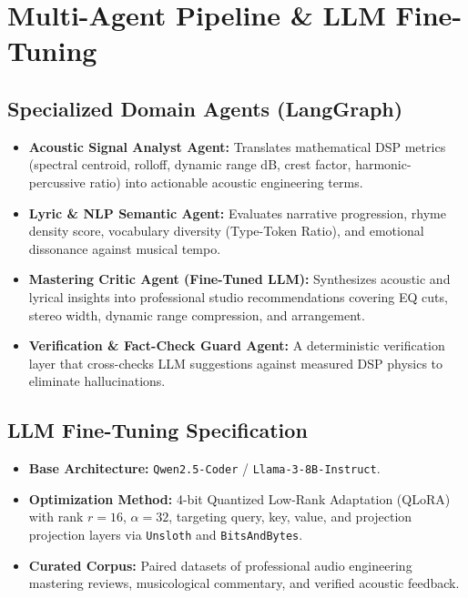 \documentclass[11pt,a4paper]{article}
\begin{document}
\section{Multi-Agent Pipeline \& LLM Fine-Tuning}

\subsection{Specialized Domain Agents (LangGraph)}
\begin{itemize}
    \item \textbf{Acoustic Signal Analyst Agent:} Translates mathematical DSP metrics (spectral centroid, rolloff, dynamic range dB, crest factor, harmonic-percussive ratio) into actionable acoustic engineering terms.
    \item \textbf{Lyric \& NLP Semantic Agent:} Evaluates narrative progression, rhyme density score, vocabulary diversity (Type-Token Ratio), and emotional dissonance against musical tempo.
    \item \textbf{Mastering Critic Agent (Fine-Tuned LLM):} Synthesizes acoustic and lyrical insights into professional studio recommendations covering EQ cuts, stereo width, dynamic range compression, and arrangement.
    \item \textbf{Verification \& Fact-Check Guard Agent:} A deterministic verification layer that cross-checks LLM suggestions against measured DSP physics to eliminate hallucinations.
\end{itemize}

\subsection{LLM Fine-Tuning Specification}
\begin{itemize}
    \item \textbf{Base Architecture:} \texttt{Qwen2.5-Coder} / \texttt{Llama-3-8B-Instruct}.
    \item \textbf{Optimization Method:} 4-bit Quantized Low-Rank Adaptation (QLoRA) with rank $r = 16$, $\alpha = 32$, targeting query, key, value, and projection projection layers via \texttt{Unsloth} and \texttt{BitsAndBytes}.
    \item \textbf{Curated Corpus:} Paired datasets of professional audio engineering mastering reviews, musicological commentary, and verified acoustic feedback.
\end{itemize}
\end{document}
